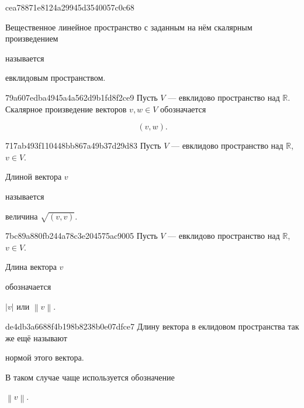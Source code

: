 \begin{note}{cea78871e8124a29945d3540057c0c68}
    \begin{icloze}{1}Вещественное линейное пространство с заданным на нём скалярным произведением\end{icloze} называется \begin{icloze}{2}евклидовым пространством.\end{icloze}
\end{note}

\begin{note}{79a607edba4945a4a562d9b1fd8f2ce9}
    Пусть \({ V }\) --- евклидово пространство над \({ \mathbb R }\).
    Скалярное произведение векторов \({ v, w \in V }\) обозначается
    \begin{icloze}{1}
        \[
            (v, w).
        \]
    \end{icloze}
\end{note}

\begin{note}{717ab493f110448bb867a49b37d29d83}
    Пусть \({ V }\) --- евклидово пространство над \({ \mathbb R }\),\: \({ v \in V }\).
    \begin{icloze}{2}Длиной вектора \({ v }\)\end{icloze} называется \begin{icloze}{1}величина \( \sqrt{(v, v)} \).\end{icloze}
\end{note}

\begin{note}{7bc89a880fb244a78c3e204575ac9005}
    Пусть \({ V }\) --- евклидово пространство над \({ \mathbb R }\),\: \({ v \in V }\).
    \begin{icloze}{2}Длина вектора \({ v }\)\end{icloze} обозначается \begin{icloze}{1}\( \left\lvert v \right\rvert \) или \({ \left\lVert v \right\rVert }\).\end{icloze}
\end{note}

\begin{note}{de4db3a6688f4b198b8238b0e07dfce7}
    Длину вектора в еклидовом пространства так же ещё называют \begin{icloze}{1}нормой этого вектора.\end{icloze} В таком случае чаще используется обозначение \begin{icloze}{2}\( \left\lVert v \right\rVert \).\end{icloze}
\end{note}

